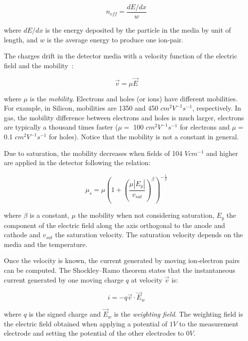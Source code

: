 \documentclass[11pt]{article}
\begin{document}
	\[n_{eff} = \frac{dE/dx}{w} \]

	where $dE/dx$ is the energy deposited by the particle in the media by
	unit of length, and $w$ is the average energy to produce one ion-pair.

	The charges drift in the detector media with a velocity function of the electric
	field and the mobility~\cite{spieler2005semiconductor}:

	\begin{equation}
		\vec{v} = \mu \vec{E}
		\label{eq:charge_speed}
	\end{equation}

	where $\mu$ is the \textit{mobility}. Electrons and holes (or ions) have different
	mobilities. For example, in Silicon, mobilities are 1350 and 450 $cm^2V^{-1}s^{-1}$,
	respectively. In gas, the mobility difference between electrons and holes is
	much larger, electrons are typically a thousand times faster ($\mu =$ 100 $cm^2V^{-1}s^{-1}$
	for electrons and $\mu =$ 0.1 $cm^2V^{-1}s^{-1}$ for holes). Notice that the mobility
	is not a constant in general.

	Due to saturation, the mobility decreases when fields of 104 $V cm^{-1}$ and higher are applied in
	the detector following the relation:

	\begin{equation}
		\mu_s = \mu \left (1 + \left (\frac{\mu |E_y|}{v_{sat}} \right )^{\beta} \right )^{-\frac{1}{\beta}}
		\label{eq:saturation}
	\end{equation}

	where $\beta$ is a constant, $\mu$ the mobility when not considering saturation,
	$E_y$ the component of the electric field along the axis orthogonal to the anode and cathode
	and $v_{sat}$ the saturation velocity. The saturation velocity depends on the
	media and the temperature.

	Once the velocity is known, the current generated by moving ion-electron
	pairs can be computed. The Shockley–Ramo theorem states that the instantaneous current generated
	by one moving charge $q$ at velocity $\vec{v}$ is:

	\begin{equation}
		i = -q \vec{v} \cdot \vec{E}_w
		\label{eq:ramo}
	\end{equation}

	where $q$ is the signed charge and $\vec{E}_w$ is the \textit{weighting field}. The weighting field is the electric field
	obtained when applying a potential of $1V$ to the measurement electrode and setting
	the potential of the other electrodes to $0V$.
\end{document}

